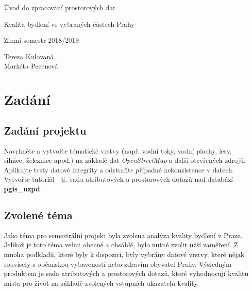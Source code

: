 \documentclass[a4paper, 12pt]{article}
\begin{document}
\begin{titlepage}
\begin{center}
\Huge
\vspace*{5.5cm}
Úvod do zpracování prostorových dat\\
\vspace{0.2cm}

\Large  
Kvalita bydlení ve vybraných částech Prahy\\
\vspace{0.2cm}

\normalsize  
Zimní semestr 2018/2019\\
\vspace{13cm}
\end{center}

\begin{flushright}
\Large
Tereza Kulovaná \\
Markéta Pecenová \\
\end{flushright}

\end{titlepage}


\pagestyle{plain}     %
\setcounter{page}{1}  %

\tableofcontents
\newpage

\section{Zadání}
\subsection{Zadání projektu}
Navrhněte a vytvořte tématické vrstvy (např. vodní toky, vodní plochy, lesy, silnice, železnice apod.) na základě dat \textit{OpenStreetMap} a další otevřených zdrojů. Aplikujte testy datové integrity a odstraňte případné nekonzistence v datech. Vytvořte tutoriál - tj. sadu atributových a prostorových dotazů nad databází \textbf{pgis\_uzpd}.

\subsection{Zvolené téma}
Jako téma pro semestrální projekt byla zvolena analýza kvality bydlení v Praze. Jelikož je toto téma velmi obecné a obsáhlé, bylo nutné zvolit užší zaměření. Z mnoha podkladů, které byly k dispozici, byly vybrány datové vrstvy, které nějak souvisely s občanskou vybaveností nebo zdravím obyvatel Prahy. Výsledným produktem je sada atributových a prostorových dotazů, které vyhodnocují kvalitu místa pro život na základě zvolených vstupních ukazatelů kvality. 
\clearpage
\end{document}
